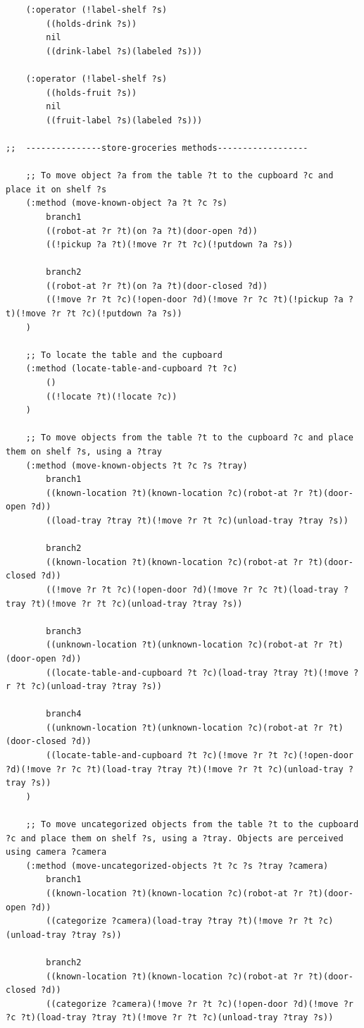 \documentclass[paper=a4, fontsize=11pt]{scrartcl}
\begin{document}
\begin{lstlisting}
	(:operator (!label-shelf ?s)
		((holds-drink ?s))
		nil
		((drink-label ?s)(labeled ?s)))

	(:operator (!label-shelf ?s)
		((holds-fruit ?s))
		nil
		((fruit-label ?s)(labeled ?s)))

;;  ---------------store-groceries methods------------------

	;; To move object ?a from the table ?t to the cupboard ?c and place it on shelf ?s
	(:method (move-known-object ?a ?t ?c ?s)
		branch1
		((robot-at ?r ?t)(on ?a ?t)(door-open ?d))
		((!pickup ?a ?t)(!move ?r ?t ?c)(!putdown ?a ?s))

		branch2
		((robot-at ?r ?t)(on ?a ?t)(door-closed ?d))
		((!move ?r ?t ?c)(!open-door ?d)(!move ?r ?c ?t)(!pickup ?a ?t)(!move ?r ?t ?c)(!putdown ?a ?s))
	)

	;; To locate the table and the cupboard
	(:method (locate-table-and-cupboard ?t ?c)
		()
		((!locate ?t)(!locate ?c))
	)

	;; To move objects from the table ?t to the cupboard ?c and place them on shelf ?s, using a ?tray
	(:method (move-known-objects ?t ?c ?s ?tray)
		branch1
		((known-location ?t)(known-location ?c)(robot-at ?r ?t)(door-open ?d))
		((load-tray ?tray ?t)(!move ?r ?t ?c)(unload-tray ?tray ?s))

		branch2
		((known-location ?t)(known-location ?c)(robot-at ?r ?t)(door-closed ?d))
		((!move ?r ?t ?c)(!open-door ?d)(!move ?r ?c ?t)(load-tray ?tray ?t)(!move ?r ?t ?c)(unload-tray ?tray ?s))

		branch3
		((unknown-location ?t)(unknown-location ?c)(robot-at ?r ?t)(door-open ?d))
		((locate-table-and-cupboard ?t ?c)(load-tray ?tray ?t)(!move ?r ?t ?c)(unload-tray ?tray ?s))

		branch4
		((unknown-location ?t)(unknown-location ?c)(robot-at ?r ?t)(door-closed ?d))
		((locate-table-and-cupboard ?t ?c)(!move ?r ?t ?c)(!open-door ?d)(!move ?r ?c ?t)(load-tray ?tray ?t)(!move ?r ?t ?c)(unload-tray ?tray ?s))
	)

	;; To move uncategorized objects from the table ?t to the cupboard ?c and place them on shelf ?s, using a ?tray. Objects are perceived using camera ?camera
	(:method (move-uncategorized-objects ?t ?c ?s ?tray ?camera)
		branch1
		((known-location ?t)(known-location ?c)(robot-at ?r ?t)(door-open ?d))
		((categorize ?camera)(load-tray ?tray ?t)(!move ?r ?t ?c)(unload-tray ?tray ?s))

		branch2
		((known-location ?t)(known-location ?c)(robot-at ?r ?t)(door-closed ?d))
		((categorize ?camera)(!move ?r ?t ?c)(!open-door ?d)(!move ?r ?c ?t)(load-tray ?tray ?t)(!move ?r ?t ?c)(unload-tray ?tray ?s))


\end{lstlisting}
\end{document}
